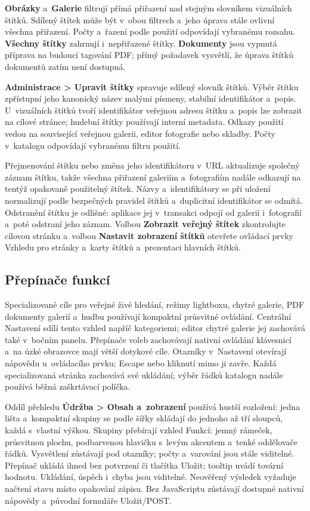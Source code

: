 \documentclass[11pt,a4paper]{article}
\newcommand{\ui}[1]{\textbf{#1}}
\begin{document}
\ui{Obrázky} a~\ui{Galerie} filtrují přímá přiřazení nad stejným slovníkem
vizuálních štítků. Sdílený štítek může být v~obou filtrech a~jeho úprava stále
ovlivní všechna přiřazení. Počty a~řazení podle použití odpovídají vybranému
rozsahu. \ui{Všechny štítky} zahrnují i~nepřiřazené štítky. \ui{Dokumenty}
jsou vypnutá příprava na budoucí tagování PDF; přímý požadavek vysvětlí,
že úprava štítků dokumentů zatím není dostupná.

\ui{Administrace > Upravit štítky} spravuje sdílený slovník štítků. Výběr
štítku zpřístupní jeho kanonický název malými písmeny, stabilní identifikátor
a~popis. U~vizuálních štítků tvoří identifikátor veřejnou adresu štítku a~popis
lze zobrazit na cílové stránce; hudební štítky používají interní metadata.
Odkazy použití vedou na související veřejnou galerii, editor fotografie nebo
skladby. Počty v~katalogu odpovídají vybranému filtru použití.

Přejmenování štítku nebo změna jeho identifikátoru v~URL aktualizuje společný
záznam štítku, takže všechna přiřazení galeriím a~fotografiím nadále odkazují na
tentýž opakovaně použitelný štítek. Názvy a~identifikátory se při uložení
normalizují podle bezpečných pravidel štítků a~duplicitní identifikátor se
odmítá. Odstranění štítku je odlišné: aplikace jej v~transakci odpojí od galerií
i~fotografií a~poté odstraní jeho záznam. Volbou \ui{Zobrazit veřejný štítek}
zkontrolujte cílovou stránku a~volbou \ui{Nastavit zobrazení štítků} otevřete
ovládací prvky Vzhledu pro stránky a~karty štítků a~prezentaci hlavních štítků.

\subsection{Přepínače funkcí}

Specializované cíle pro veřejné živé hledání, režimy lightboxu, chytré galerie,
PDF dokumenty galerií a~hudbu používají kompaktní průsvitné ovládání. Centrální
Nastavení sdílí tento vzhled napříč kategoriemi; editor chytré galerie jej
zachovává také v~bočním panelu. Přepínače voleb zachovávají nativní ovládání
klávesnicí a~na úzké obrazovce mají větší dotykové cíle. Otazníky v~Nastavení
otevírají nápovědu u~ovládacího prvku; Escape nebo kliknutí mimo ji zavře.
Každá specializovaná stránka zachovává své ukládání; výběr řádků katalogu
nadále používá běžná zaškrtávací políčka.

Oddíl přehledu \ui{Údržba > Obsah a~zobrazení} používá hustší rozložení:
jedna lišta a~kompaktní skupiny se podle šířky skládají do jednoho až
tří sloupců, každá s~vlastní výškou. Skupiny přebírají vzhled Funkcí: jemný
rámeček, průsvitnou plochu, podbarvenou hlavičku s~levým akcentem a~tenké
oddělovače řádků. Vysvětlení zůstávají pod otazníky; počty
a~varování jsou stále viditelné. Přepínač ukládá ihned bez potvrzení či tlačítka
Uložit; tooltip uvádí tovární hodnotu. Ukládání, úspěch i~chyba jsou viditelné.
Neověřený výsledek vyžaduje načtení stavu místo opakování zápisu. Bez
JavaScriptu zůstávají dostupné nativní nápovědy a~původní formuláře Uložit/POST.
\end{document}

